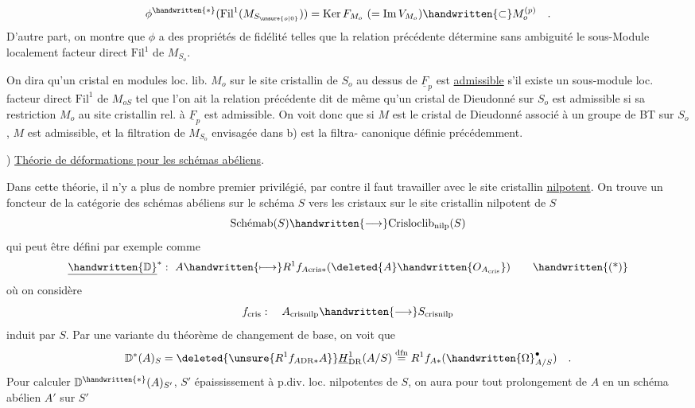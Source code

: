 \[
\phi^{\handwritten{*}}(\mathrm{Fil}^1(M_{S_{\unsure{o|0}}}))=
\operatorname{Ker} F_{M_o}\ (=\operatorname{Im}V_{M_o})\handwritten{\subset}M_o^{(p)}\quad .
\]
D'autre part, on montre que $\phi$ a des propriétés de fidélité telles que la relation précédente détermine sans ambiguité le sous-Module localement facteur direct $\mathrm{Fil}^1$ de $M_{S_o}$.

On dira qu'un cristal en modules loc. lib. $M_o$ sur le site cristallin de $S_o$ au dessus de $\underline{F}_p$ est \uline{admissible} s'il existe un sous-module loc.  facteur direct $\mathrm{Fil}^1$ de $M_{oS}$ tel que l'on ait la relation précédente\unsure{;|,}   dit de même qu'un cristal de Dieudonné  sur $S_o$ est admissible si sa restriction $M_o$  au site cristallin rel. à $\underline{F}_p$ est admissible. On voit donc que si $M$ est le cristal de Dieudonné associé à un groupe de BT sur $S_o$, $M$ est admissible, et la filtration de $M_{S_o}$ envisagée dans b) est la filtra- canonique définie précédemment.


) \uline{Théorie de déformations pour les schémas abéliens}.

 Dans cette théorie, il n'y a plus de nombre premier privilégié, par contre il faut travailler avec le site cristallin \uline{nilpotent}. On trouve un foncteur  de la catégorie des schémas abéliens sur le schéma $S$ vers les  cristaux sur le site cristallin nilpotent de $S$
\[
\text{Schémab}(S)\handwritten{\longrightarrow}\mathrm{Crisloclib}_{\mathrm{nilp}}(S)
\]
qui peut être défini par exemple comme
\[
\underline{\handwritten{\mathbb{D}}}^{*}:\ A\handwritten{\longmapsto}R^1 f_{A\mathrm{cris}*}(\deleted{A}\handwritten{O_{A_{\mathrm{cris}}}})
\tag*{\handwritten{(*)}}
\]
où on considère
\[
f_{\mathrm{cris}}:\quad A_{\mathrm{crisnilp}}\handwritten{\longrightarrow}S_{\mathrm{crisnilp}}
\]
induit par $S$. Par une variante du théorème de changement de base, on voit que
\[
\mathbb{D}^*(A)_S=\deleted{\unsure{R^1 f_{A\mathrm{DR}*} A}}\underline{H}_{\mathrm{DR}}^1(A/S)\overset{\mathrm{dfn}}{=}R^1 f_{A*}(\handwritten{\Omega}_{A/S}^{\bullet})\quad .
\]
Pour calculer $\mathbb{D}^{\handwritten{*}}(A)_{S'}$, $S'$ épaississement à p.div. loc. nilpotentes de $S$, on aura pour tout prolongement  de $A$ en un schéma abélien $A'$ sur $S'$
